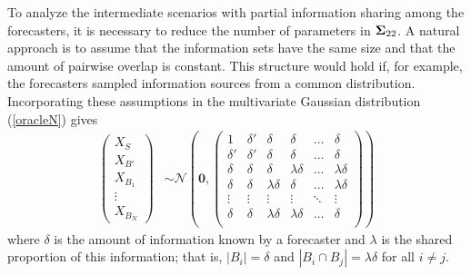 \documentclass[12pt]{article}
\theoremstyle{definition}
\theoremstyle{definition}
\def\probit{p_{\rm probit}}
\begin{document}
To analyze the intermediate scenarios with partial information sharing among the forecasters, it is necessary to reduce the number of parameters in ${\bf\Sigma}_{22}$. A natural approach is to assume that the
information sets have the same size and that the amount of pairwise overlap
is constant.
This structure would hold if, for example, the
forecasters sampled information sources from a common distribution.
Incorporating these assumptions in the multivariate Gaussian distribution
(\ref{oracleN}) gives
\begin{align}
\left(\begin{matrix} X_{S} \\ X_{B'}\\ X_{B_1}\\ \vdots \\ X_{B_N} \end{matrix}\right) &\sim \mathcal{N}\left( 
 \boldsymbol{0}, 
 \left(\begin{array}{cc|cccc}
1 & \delta'& \delta & \delta & \dots & \delta  \\ 
\delta' & \delta' & \delta & \delta & \dots & \delta  \\ \hline
\delta & \delta &\delta & \lambda\delta & \dots & \lambda\delta   \\ 
\delta& \delta & \lambda\delta & \delta & \dots & \lambda\delta  \\ 
\vdots &\vdots & \vdots & \vdots & \ddots & \vdots  \\ 
\delta &\delta & \lambda\delta & \lambda\delta & \dots & \delta\\ 
 \end{array}\right)\right) \label{symmetric}
\end{align}
where $\delta$ is the amount of information known by a forecaster and
$\lambda$ is the shared proportion of this information; that is, $|B_{i}| =
\delta$ and $|B_{i} \cap B_{j}| = \lambda \delta$ for all $i \neq
j$.
\end{document}
